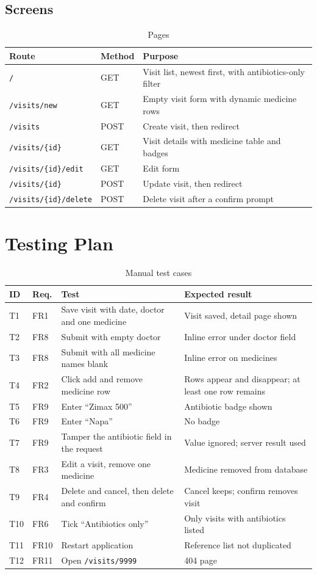 \documentclass[11pt,a4paper]{article}
\begin{document}
\subsection{Screens}
\begin{table}[H]
\centering
\caption{Pages}
\begin{tabularx}{\textwidth}{llY}
\toprule
\textbf{Route} & \textbf{Method} & \textbf{Purpose}\\
\midrule
\texttt{/} & GET & Visit list, newest first, with antibiotics-only filter\\
\texttt{/visits/new} & GET & Empty visit form with dynamic medicine rows\\
\texttt{/visits} & POST & Create visit, then redirect\\
\texttt{/visits/\{id\}} & GET & Visit details with medicine table and badges\\
\texttt{/visits/\{id\}/edit} & GET & Edit form\\
\texttt{/visits/\{id\}} & POST & Update visit, then redirect\\
\texttt{/visits/\{id\}/delete} & POST & Delete visit after a confirm prompt\\
\bottomrule
\end{tabularx}
\end{table}

\section{Testing Plan}
\begin{table}[H]
\centering
\caption{Manual test cases}
\begin{tabularx}{\textwidth}{llYY}
\toprule
\textbf{ID} & \textbf{Req.} & \textbf{Test} & \textbf{Expected result}\\
\midrule
T1 & FR1 & Save visit with date, doctor and one medicine & Visit saved, detail page shown\\
T2 & FR8 & Submit with empty doctor & Inline error under doctor field\\
T3 & FR8 & Submit with all medicine names blank & Inline error on medicines\\
T4 & FR2 & Click add and remove medicine row & Rows appear and disappear; at least one row remains\\
T5 & FR9 & Enter ``Zimax 500'' & Antibiotic badge shown\\
T6 & FR9 & Enter ``Napa'' & No badge\\
T7 & FR9 & Tamper the antibiotic field in the request & Value ignored; server result used\\
T8 & FR3 & Edit a visit, remove one medicine & Medicine removed from database\\
T9 & FR4 & Delete and cancel, then delete and confirm & Cancel keeps; confirm removes visit\\
T10 & FR6 & Tick ``Antibiotics only'' & Only visits with antibiotics listed\\
T11 & FR10 & Restart application & Reference list not duplicated\\
T12 & FR11 & Open \texttt{/visits/9999} & 404 page\\
\bottomrule
\end{tabularx}
\end{table}
\end{document}
